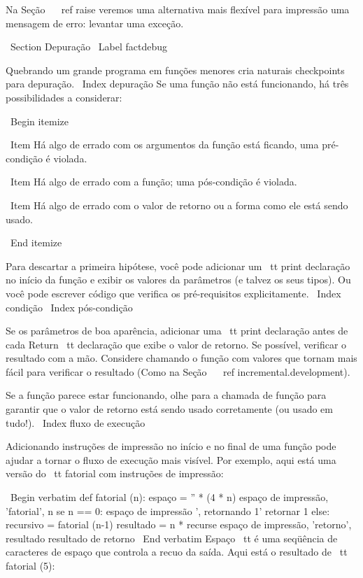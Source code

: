 \documentclass[10pt]{book}
\begin{document}
{{{{Na Seção ~ \ ref {} raise veremos uma alternativa mais flexível para impressão
uma mensagem de erro: levantar uma exceção.


\ Section {} Depuração
\ Label {} factdebug

Quebrando um grande programa em funções menores cria naturais
checkpoints para depuração. \ Index {depuração}
Se uma função não está funcionando, há
três possibilidades a considerar:

\ Begin {itemize}

\ Item Há algo de errado com os argumentos da função
está ficando, uma pré-condição é violada.

\ Item Há algo de errado com a função; uma pós-condição
é violada.

\ Item Há algo de errado com o valor de retorno ou a
forma como ele está sendo usado.

\ End {itemize}

Para descartar a primeira hipótese, você pode adicionar um {\ tt print} declaração
no início da função e exibir os valores da
parâmetros (e talvez os seus tipos). Ou você pode escrever código
que verifica os pré-requisitos explicitamente.
\ Index {condição}
\ Index {pós-condição}

Se os parâmetros de boa aparência, adicionar uma {\ tt print} declaração antes de cada
{Return \ tt} declaração que exibe o valor de retorno. Se
possível, verificar o resultado com a mão. Considere chamando o
função com valores que tornam mais fácil para verificar o resultado
(Como na Seção ~ \ ref {incremental.development}).

Se a função parece estar funcionando, olhe para a chamada de função
para garantir que o valor de retorno está sendo usado corretamente (ou usado
em tudo!).
\ Index {fluxo de execução}

Adicionando instruções de impressão no início e no final de uma função
pode ajudar a tornar o fluxo de execução mais visível.
Por exemplo, aqui está uma versão do {\ tt fatorial} com
instruções de impressão:

\ Begin {verbatim}
def fatorial (n):
    espaço = '' * (4 * n)
    espaço de impressão, 'fatorial', n
    se n == 0:
        espaço de impressão ', retornando 1'
        retornar 1
    else:
        recursivo = fatorial (n-1)
        resultado = n * recurse
        espaço de impressão, 'retorno', resultado
        resultado de retorno
\ End {verbatim}
%
{Espaço \ tt} é uma seqüência de caracteres de espaço que controla a
recuo da saída. Aqui está o resultado de {\ tt fatorial (5)}:

}}}}
\end{document}
